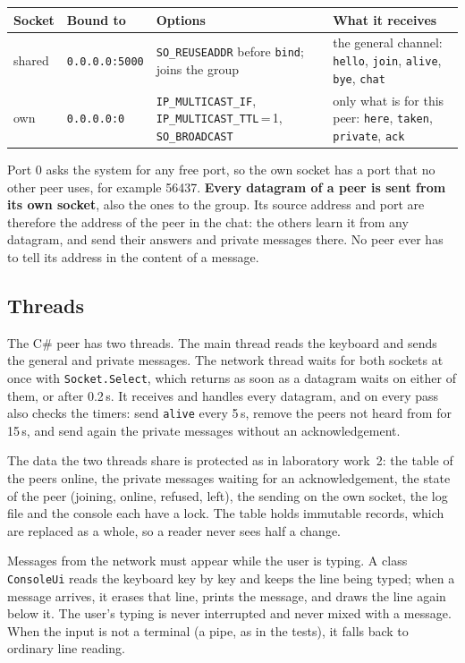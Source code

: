 \documentclass[11pt,a4paper]{article}
\newcommand{\code}[1]{{\frenchspacing\texttt{#1}}}
\begin{document}
\begin{center}
\small
\begin{tabularx}{\linewidth}{@{}lp{2.3cm}>{\raggedright\arraybackslash}p{4.9cm}X@{}}
\toprule
Socket & Bound to & Options & What it receives \\
\midrule
shared & \code{0.0.0.0:5000} & \code{SO\_REUSEADDR} before \code{bind}; joins the group &
  the general channel: \code{hello}, \code{join}, \code{alive}, \code{bye}, \code{chat} \\
own & \code{0.0.0.0:0} & \code{IP\_MULTICAST\_IF}, \code{IP\_MULTICAST\_TTL}\,=\,1, \code{SO\_BROADCAST} &
  only what is for this peer: \code{here}, \code{taken}, \code{private}, \code{ack} \\
\bottomrule
\end{tabularx}
\end{center}

Port 0 asks the system for any free port, so the own socket has a port that no other peer uses,
for example 56437. \textbf{Every datagram of a peer is sent from its own socket}, also the ones to
the group. Its source address and port are therefore the address of the peer in the chat: the
others learn it from any datagram, and send their answers and private messages there. No peer ever
has to tell its address in the content of a message.

\subsection{Threads}

The C\# peer has two threads. The main thread reads the keyboard and sends the general and private
messages. The network thread waits for both sockets at once with \code{Socket.Select}, which returns
as soon as a datagram waits on either of them, or after 0.2\,s. It receives and handles every
datagram, and on every pass also checks the timers: send \code{alive} every 5\,s, remove the peers
not heard from for 15\,s, and send again the private messages without an acknowledgement.

The data the two threads share is protected as in laboratory work~2: the table of the peers online,
the private messages waiting for an acknowledgement, the state of the peer (joining, online,
refused, left), the sending on the own socket, the log file and the console each have a lock. The
table holds immutable records, which are replaced as a whole, so a reader never sees half a change.

Messages from the network must appear while the user is typing. A class \code{ConsoleUi} reads the
keyboard key by key and keeps the line being typed; when a message arrives, it erases that line,
prints the message, and draws the line again below it. The user's typing is never interrupted and
never mixed with a message. When the input is not a terminal (a pipe, as in the tests), it falls
back to ordinary line reading.
\end{document}
